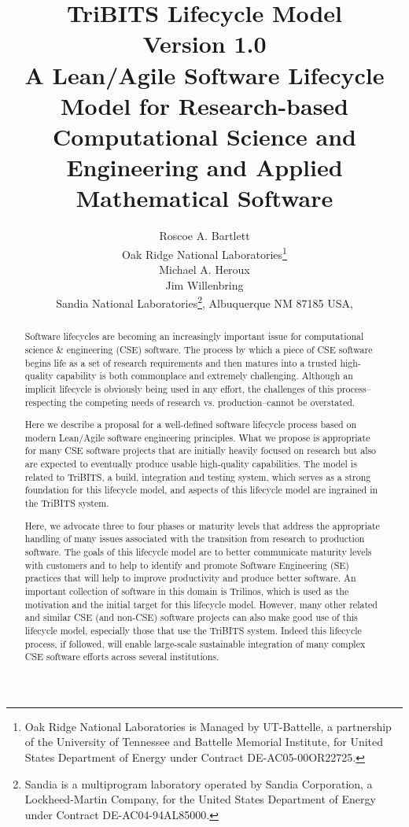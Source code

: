 \documentclass[11pt]{SANDreport}
\title{\center
TriBITS Lifecycle Model \\[2ex] Version 1.0 \\[2ex] \large A
Lean/Agile Software Lifecycle Model for Research-based Computational
Science and Engineering and Applied Mathematical Software }
\author{
Roscoe A. Bartlett \\ Oak Ridge National Laboratories\footnote{Oak
Ridge National Laboratories is Managed by UT-Battelle, a partnership
of the University of Tennessee and Battelle Memorial Institute, for
United States Department of Energy under Contract DE-AC05-00OR22725.} 
\\[2ex] Michael A. Heroux \\ Jim Willenbring \\ Sandia
National Laboratories\footnote{Sandia is a multiprogram laboratory
operated by Sandia Corporation, a Lockheed-Martin Company, for the
United States Department of Energy under Contract DE-AC04-94AL85000.},
Albuquerque NM 87185 USA, \\ }
\date{}
\begin{document}

\maketitle

%

%
\begin{abstract}
%

Software lifecycles are becoming an increasingly important issue for computational science \& engineering (CSE) software.  The process by which a piece of CSE software begins life as a set of research requirements and then matures into a trusted high-quality capability is both commonplace and extremely challenging.  Although an implicit lifecycle is obviously being used in any effort, the challenges of this process--respecting the competing needs of research vs. production--cannot be overstated.

Here we describe a proposal for a well-defined software lifecycle process based on modern Lean/Agile software engineering principles. What we propose is appropriate for many CSE software projects that are initially heavily focused on research but also are expected to eventually produce usable high-quality capabilities.  The model is related to TriBITS, a build, integration and testing system, which serves as a strong foundation for this lifecycle model, and aspects of this lifecycle model are ingrained in the TriBITS system.

Here, we advocate three to four phases or maturity levels that address
the appropriate handling of many issues associated with the transition
from research to production software.  The goals of this lifecycle
model are to better communicate maturity levels with customers and to
help to identify and promote Software Engineering (SE) practices that
will help to improve productivity and produce better software.  An
important collection of software in this domain is Trilinos, which is
used as the motivation and the initial target for this lifecycle
model.  However, many other related and similar CSE (and non-CSE)
software projects can also make good use of this lifecycle model,
especially those that use the TriBITS system.  Indeed this lifecycle
process, if followed, will enable large-scale sustainable integration
of many complex CSE software efforts across several institutions.

%
\end{abstract}
%
\end{document}
